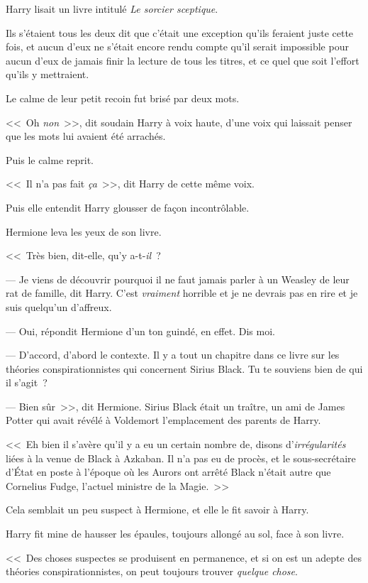 Harry lisait un livre intitulé \emph{Le sorcier sceptique}.

Ils s'étaient tous les deux dit que c'était une exception qu'ils feraient juste cette fois, et aucun d'eux ne s'était encore rendu compte qu'il serait impossible pour aucun d'eux de jamais finir la lecture de tous les titres, et ce quel que soit l'effort qu'ils y mettraient.

Le calme de leur petit recoin fut brisé par deux mots.

<<~Oh \emph{non}~>>, dit soudain Harry à voix haute, d'une voix qui laissait penser que les mots lui avaient été arrachés.

Puis le calme reprit.

<<~Il n'a pas fait \emph{ça}~>>, dit Harry de cette même voix.

Puis elle entendit Harry glousser de façon incontrôlable.

Hermione leva les yeux de son livre.

<<~Très bien, dit-elle, qu'y a-t-\emph{il}~?

--- Je viens de découvrir pourquoi il ne faut jamais parler à un Weasley de leur rat de famille, dit Harry. C'est \emph{vraiment} horrible et je ne devrais pas en rire et je suis quelqu'un d'affreux.

--- Oui, répondit Hermione d'un ton guindé, en effet. Dis moi.

--- D'accord, d'abord le contexte. Il y a tout un chapitre dans ce livre sur les théories conspirationnistes qui concernent Sirius Black. Tu te souviens bien de qui il s'agit~?

--- Bien sûr~>>, dit Hermione. Sirius Black était un traître, un ami de James Potter qui avait révélé à Voldemort l'emplacement des parents de Harry.

<<~Eh bien il s'avère qu'il y a eu un certain nombre de, disons d'\emph{irrégularités} liées à la venue de Black à Azkaban. Il n'a pas eu de procès, et le sous-secrétaire d'État en poste à l'époque où les Aurors ont arrêté Black n'était autre que Cornelius Fudge, l'actuel ministre de la Magie.~>>

Cela semblait un peu suspect à Hermione, et elle le fit savoir à Harry.

Harry fit mine de hausser les épaules, toujours allongé au sol, face à son livre.

<<~Des choses suspectes se produisent en permanence, et si on est un adepte des théories conspirationnistes, on peut toujours trouver \emph{quelque chose}.

